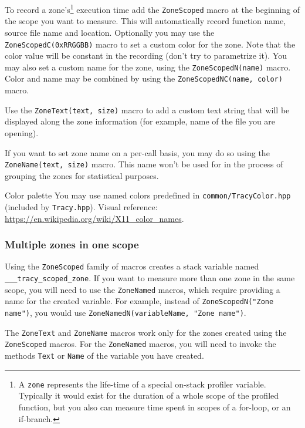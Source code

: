 \documentclass[hidelinks,titlepage,a4paper]{article}
\begin{document}
To record a zone's\footnote{A \texttt{zone} represents the life-time of a special on-stack profiler variable. Typically it would exist for the duration of a whole scope of the profiled function, but you also can measure time spent in scopes of a for-loop, or an if-branch.} execution time add the \texttt{ZoneScoped} macro at the beginning of the scope you want to measure. This will automatically record function name, source file name and location. Optionally you may use the \texttt{ZoneScopedC(0xRRGGBB)} macro to set a custom color for the zone. Note that the color value will be constant in the recording (don't try to parametrize it). You may also set a custom name for the zone, using the \texttt{ZoneScopedN(name)} macro. Color and name may be combined by using the \texttt{ZoneScopedNC(name, color)} macro.

Use the \texttt{ZoneText(text, size)} macro to add a custom text string that will be displayed along the zone information (for example, name of the file you are opening).

If you want to set zone name on a per-call basis, you may do so using the \texttt{ZoneName(text, size)} macro. This name won't be used for in the process of grouping the zones for statistical purposes.

\begin{bclogo}[
noborder=true,
couleur=black!5,
logo=\bclampe
]{Color palette}
You may use named colors predefined in \texttt{common/TracyColor.hpp} (included by \texttt{Tracy.hpp}). Visual reference: \url{https://en.wikipedia.org/wiki/X11_color_names}.
\end{bclogo}

\subsubsection{Multiple zones in one scope}
\label{multizone}

Using the \texttt{ZoneScoped} family of macros creates a stack variable named \texttt{\_\_\_tracy\_scoped\_zone}. If you want to measure more than one zone in the same scope, you will need to use the \texttt{ZoneNamed} macros, which require providing a name for the created variable. For example, instead of \texttt{ZoneScopedN("Zone name")}, you would use \texttt{ZoneNamedN(variableName, "Zone name")}.

The \texttt{ZoneText} and \texttt{ZoneName} macros work only for the zones created using the \texttt{ZoneScoped} macros. For the \texttt{ZoneNamed} macros, you will need to invoke the methods \texttt{Text} or \texttt{Name} of the variable you have created.
\end{document}
